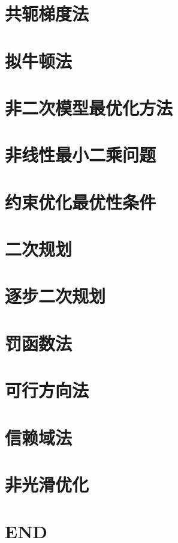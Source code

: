 \documentclass[UTF8]{../../09-Mathematics}
\begin{document}
\chapter{共轭梯度法}
\chapter{拟牛顿法}

\chapter{非二次模型最优化方法}
\chapter{非线性最小二乘问题}
\chapter{约束优化最优性条件}
\chapter{二次规划}
\chapter{逐步二次规划}

\chapter{罚函数法}
\chapter{可行方向法}
\chapter{信赖域法}
\chapter{非光滑优化}



\chapter{END}
\end{document}
